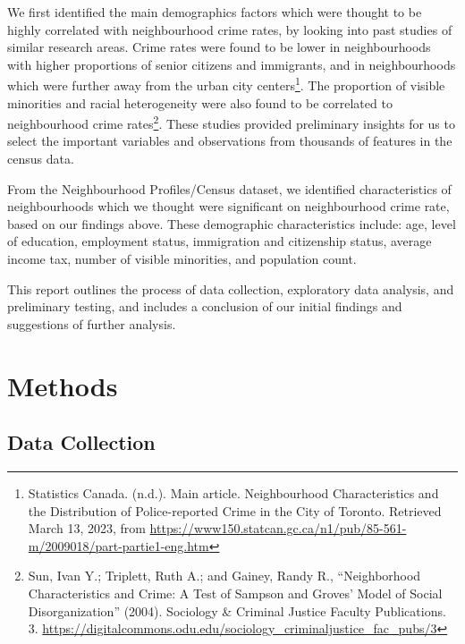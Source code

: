 \documentclass[
]{article}
\begin{document}
We first identified the main demographics factors which were thought to
be highly correlated with neighbourhood crime rates, by looking into
past studies of similar research areas. Crime rates were found to be
lower in neighbourhoods with higher proportions of senior citizens and
immigrants, and in neighbourhoods which were further away from the urban
city centers\footnote{Statistics Canada. (n.d.). Main article.
  Neighbourhood Characteristics and the Distribution of Police-reported
  Crime in the City of Toronto. Retrieved March 13, 2023, from
  \url{https://www150.statcan.gc.ca/n1/pub/85-561-m/2009018/part-partie1-eng.htm}}.
The proportion of visible minorities and racial heterogeneity were also
found to be correlated to neighbourhood crime rates\footnote{Sun, Ivan
  Y.; Triplett, Ruth A.; and Gainey, Randy R., ``Neighborhood
  Characteristics and Crime: A Test of Sampson and Groves' Model of
  Social Disorganization'' (2004). Sociology \& Criminal Justice Faculty
  Publications. 3.
  \url{https://digitalcommons.odu.edu/sociology_criminaljustice_fac_pubs/3}}.
These studies provided preliminary insights for us to select the
important variables and observations from thousands of features in the
census data.

From the Neighbourhood Profiles/Census dataset, we identified
characteristics of neighbourhoods which we thought were significant on
neighbourhood crime rate, based on our findings above. These demographic
characteristics include: age, level of education, employment status,
immigration and citizenship status, average income tax, number of
visible minorities, and population count.

This report outlines the process of data collection, exploratory data
analysis, and preliminary testing, and includes a conclusion of our
initial findings and suggestions of further analysis.

\hypertarget{methods}{%
\section{Methods}\label{methods}}

\hypertarget{data-collection}{%
\subsection{Data Collection}\label{data-collection}}
\end{document}
